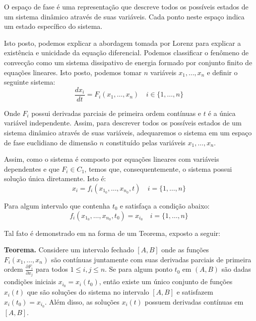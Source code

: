 \documentclass[12pt, a4paper]{article}
\begin{document}
    O espaço de fase é uma representação que descreve todos os possíveis
    estados de um sistema dinâmico através de suas variáveis. Cada ponto neste
    espaço indica um estado específico do sistema.
    
    Isto posto, podemos explicar a abordagem tomada por Lorenz para explicar a
    existência e unicidade da equação diferencial. Podemos classificar o fenômeno
    de convecção como um sistema dissipativo de energia formado por conjunto finito
    de equações lineares. Isto posto, podemos tomar $n$ variáveis $x_1, \ldots,
        x_n$ e definir o seguinte sistema:
    \begin{equation}
        \frac{dx_i}{dt} = F_i\left(x_1, \ldots, x_n\right) \quad i \in \{1,
        \ldots, n\}
    \end{equation}
    
    Onde $F_i$ possui derivadas parciais de primeira ordem contínuas e $t$ é a
    única variável independente. Assim, para descrever todos os possíveis estados
    de um sistema dinâmico através de suas variáveis, adequaremos o sistema em um
    espaço de fase euclidiano de dimensão $n$ constituído pelas variáveis $x_1,
        \ldots, x_n$.
    
    Assim, como o sistema é composto por equações lineares com variáveis
    dependentes e que $F_i \in C_1$, temos que, consequentemente, o sistema possui
    solução única diretamente. Isto é:
    \begin{equation}
        x_i = f_i(x_{1_0}, \ldots, x_{n_0}, t) \quad i = \{1, \ldots, n\}
    \end{equation}
    
    Para algum intervalo que contenha $t_0$ e satisfaça a condição abaixo:
    \begin{equation*}
        f_i(x_{1_0}, \ldots, x_{n_0}, t_0) = x_{i_0} \quad i = \{1, \ldots,
        n\}
    \end{equation*}
    
    Tal fato é demonstrado em \cite{ford1933} na forma de um Teorema, exposto a
    seguir:
    
    \textbf{Teorema.} Considere um intervalo fechado $[A, B]$ onde as funções
    $F_i(x_1, \ldots, x_n)$ são contínuas juntamente com suas derivadas parciais de
    primeira ordem $\frac{\partial F_i}{\partial x_j}$ para todos $1 \leq i,j \leq
        n$. Se para algum ponto $t_0$ em $(A, B)$ são dadas condições iniciais
    $x_{i_0}
        = x_i(t_0)$, então existe um único conjunto de funções $x_i(t)$ que são
    soluções do sistema no intervalo $[A, B]$ e satisfazem $x_i(t_0) = x_{i_0}$.
    Além disso, as soluções $x_i(t)$ possuem derivadas contínuas em $[A, B]$.
    
\end{document}
